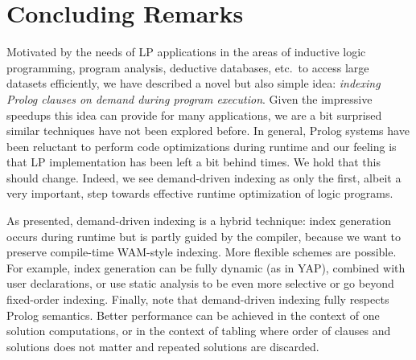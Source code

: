 \documentclass{llncs}
\newcommand{\JITI}{demand-driven indexing\xspace}
\begin{document}
\section{Concluding Remarks}
Motivated by the needs of LP applications in the areas of inductive
logic programming, program analysis, deductive databases, etc.\ to
access large datasets efficiently, we have described a novel but also
simple idea: \emph{indexing Prolog clauses on demand during program
execution}.
%
Given the impressive speedups this idea can provide for many
applications, we are a bit surprised similar techniques have not been
explored before. In general, Prolog systems have been reluctant to
perform code optimizations during runtime and our feeling is that LP
implementation has been left a bit behind times. We hold that this
should change.
%
Indeed, we see \JITI as only the first, albeit a very important, step
towards effective runtime optimization of logic programs.

As presented, \JITI is a hybrid technique: index generation occurs
during runtime but is partly guided by the compiler, because we want
to preserve compile-time WAM-style indexing. More flexible schemes are
possible. For example, index generation can be fully dynamic (as in
YAP), combined with user declarations, or use static analysis to be
even more selective or go beyond fixed-order indexing.
%
Finally, note that \JITI fully respects Prolog semantics. Better
performance can be achieved in the context of one solution
computations, or in the context of tabling where order of clauses and
solutions does not matter and repeated solutions are discarded.




\end{document}

